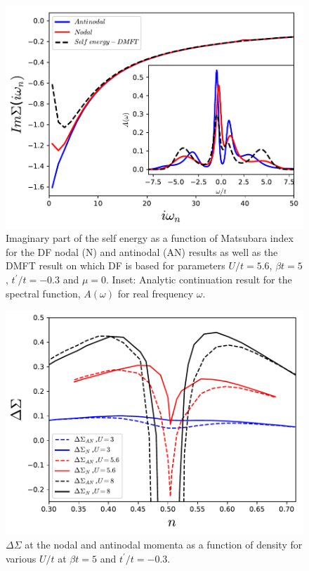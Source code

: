 \documentclass[twocolumn,notitlepage,prb,superscriptaddress,showpacs]{revtex4-1}
\begin{document}
\begin{figure}
\centering
    \includegraphics[width=0.95\linewidth]{selfenergy_spectral.pdf}
        \caption{\label{fig:selfedmft} Imaginary part of the self energy as a function of Matsubara index for the DF nodal (N) and antinodal (AN) results as well as the DMFT result on which DF is based for parameters $U/t=5.6$, $\beta t=5$, $t^\prime /t=-0.3$ and $\mu=0$.  Inset: Analytic continuation result for the spectral function, $A(\omega)$ for real frequency $\omega$.}
\end{figure}

\begin{figure}
\centering
    \includegraphics[width=0.95\linewidth]{deltasigma_all.pdf}
\caption{ $\Delta \Sigma$ at the nodal and antinodal momenta as a function of density for various $U/t$ at $\beta t=5$ and $t^\prime /t=-0.3$.  \label{fig:deltasigmal}}
\end{figure} 
\end{document}
